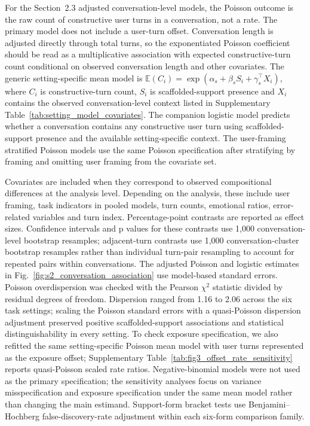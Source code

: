 For the Section~2.3 adjusted conversation-level models, the Poisson outcome is the raw count of constructive user turns in a conversation, not a rate. The primary model does not include a user-turn offset. Conversation length is adjusted directly through total turns, so the exponentiated Poisson coefficient should be read as a multiplicative association with expected constructive-turn count conditional on observed conversation length and other covariates. The generic setting-specific mean model is $\mathbb{E}(C_i)=\exp(\alpha_s+\beta_s S_i+\gamma_s^\top X_i)$, where $C_i$ is constructive-turn count, $S_i$ is scaffolded-support presence and $X_i$ contains the observed conversation-level context listed in Supplementary Table~\ref{tab:setting_model_covariates}. The companion logistic model predicts whether a conversation contains any constructive user turn using scaffolded-support presence and the available setting-specific context. The user-framing stratified Poisson models use the same Poisson specification after stratifying by framing and omitting user framing from the covariate set.

Covariates are included when they correspond to observed compositional differences at the analysis level. Depending on the analysis, these include user framing, task indicators in pooled models, turn counts, emotional ratios, error-related variables and turn index. Percentage-point contrasts are reported as effect sizes. Confidence intervals and p values for these contrasts use 1,000 conversation-level bootstrap resamples; adjacent-turn contrasts use 1,000 conversation-cluster bootstrap resamples rather than individual turn-pair resampling to account for repeated pairs within conversations. The adjusted Poisson and logistic estimates in Fig.~\ref{fig:s2_conversation_association} use model-based standard errors. Poisson overdispersion was checked with the Pearson $\chi^2$ statistic divided by residual degrees of freedom. Dispersion ranged from 1.16 to 2.06 across the six task settings; scaling the Poisson standard errors with a quasi-Poisson dispersion adjustment preserved positive scaffolded-support associations and statistical distinguishability in every setting. To check exposure specification, we also refitted the same setting-specific Poisson mean model with user turns represented as the exposure offset; Supplementary Table~\ref{tab:fig3_offset_rate_sensitivity} reports quasi-Poisson scaled rate ratios. Negative-binomial models were not used as the primary specification; the sensitivity analyses focus on variance misspecification and exposure specification under the same mean model rather than changing the main estimand. Support-form bracket tests use Benjamini--Hochberg false-discovery-rate adjustment within each six-form comparison family.


